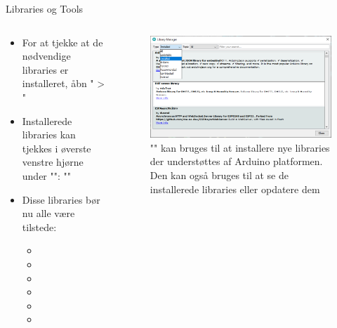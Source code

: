 \documentclass[aspectratio=169]{beamer}
\begin{document}
\begin{frame}{Libraries og Tools}
\begin{columns}
	\begin{column}{0.5\textwidth}
		\begin{textBox}
			\begin{itemize}
				\item For at tjekke at de nødvendige libraries er installeret, åbn " > "
				\item Installerede libraries kan tjekkes i øverste venstre hjørne under "": ""
				\item Disse libraries bør nu alle være tilstede:
				\begin{itemize}
					\item {}
					\item {}
					\item {}
					\item {}
					\item {}
					\item {}
				\end{itemize}
			\end{itemize}
		\end{textBox}
	\end{column}
	\begin{column}{0.5\textwidth}
		\begin{figure}
  			\includegraphics[width=\textwidth]{assets/pictures/librarymanager-installed.png}
  			\caption{"" kan bruges til at installere nye libraries der understøttes af Arduino platformen. Den kan også bruges til at se de installerede libraries eller opdatere dem}
  			\label{fig:librarymanager-installed}
  		\end{figure}
	\end{column}
\end{columns}
\end{frame}
\end{document}
